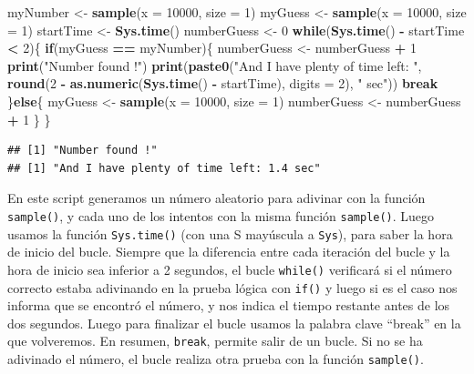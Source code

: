 \documentclass[
]{book}
\newenvironment{Shaded}{\begin{snugshade}}{\end{snugshade}}
\newcommand{\ControlFlowTok}[1]{\textcolor[rgb]{0.13,0.29,0.53}{\textbf{#1}}}
\newcommand{\DataTypeTok}[1]{\textcolor[rgb]{0.13,0.29,0.53}{#1}}
\newcommand{\DecValTok}[1]{\textcolor[rgb]{0.00,0.00,0.81}{#1}}
\newcommand{\KeywordTok}[1]{\textcolor[rgb]{0.13,0.29,0.53}{\textbf{#1}}}
\newcommand{\NormalTok}[1]{#1}
\newcommand{\OperatorTok}[1]{\textcolor[rgb]{0.81,0.36,0.00}{\textbf{#1}}}
\newcommand{\StringTok}[1]{\textcolor[rgb]{0.31,0.60,0.02}{#1}}
\begin{document}
\begin{Shaded}
\begin{Highlighting}[]
\NormalTok{myNumber <-}\StringTok{ }\KeywordTok{sample}\NormalTok{(}\DataTypeTok{x =} \DecValTok{10000}\NormalTok{, }\DataTypeTok{size =} \DecValTok{1}\NormalTok{)}
\NormalTok{myGuess <-}\StringTok{ }\KeywordTok{sample}\NormalTok{(}\DataTypeTok{x =} \DecValTok{10000}\NormalTok{, }\DataTypeTok{size =} \DecValTok{1}\NormalTok{)}
\NormalTok{startTime <-}\StringTok{ }\KeywordTok{Sys.time}\NormalTok{()}
\NormalTok{numberGuess <-}\StringTok{ }\DecValTok{0}
\ControlFlowTok{while}\NormalTok{(}\KeywordTok{Sys.time}\NormalTok{() }\OperatorTok{-}\StringTok{ }\NormalTok{startTime }\OperatorTok{<}\StringTok{ }\DecValTok{2}\NormalTok{)\{}
  \ControlFlowTok{if}\NormalTok{(myGuess }\OperatorTok{==}\StringTok{ }\NormalTok{myNumber)\{}
\NormalTok{    numberGuess <-}\StringTok{ }\NormalTok{numberGuess }\OperatorTok{+}\StringTok{ }\DecValTok{1}
    \KeywordTok{print}\NormalTok{(}\StringTok{"Number found !"}\NormalTok{)}
    \KeywordTok{print}\NormalTok{(}\KeywordTok{paste0}\NormalTok{(}\StringTok{"And I have plenty of time left: "}\NormalTok{, }
      \KeywordTok{round}\NormalTok{(}\DecValTok{2} \OperatorTok{-}\StringTok{ }\KeywordTok{as.numeric}\NormalTok{(}\KeywordTok{Sys.time}\NormalTok{() }\OperatorTok{-}\StringTok{ }\NormalTok{startTime), }\DataTypeTok{digits =} \DecValTok{2}\NormalTok{), }
      \StringTok{" sec"}\NormalTok{))}
    \ControlFlowTok{break}
\NormalTok{  \}}\ControlFlowTok{else}\NormalTok{\{}
\NormalTok{    myGuess <-}\StringTok{ }\KeywordTok{sample}\NormalTok{(}\DataTypeTok{x =} \DecValTok{10000}\NormalTok{, }\DataTypeTok{size =} \DecValTok{1}\NormalTok{)}
\NormalTok{    numberGuess <-}\StringTok{ }\NormalTok{numberGuess }\OperatorTok{+}\StringTok{ }\DecValTok{1}
\NormalTok{  \}}
\NormalTok{\}}
\end{Highlighting}
\end{Shaded}

\begin{verbatim}
## [1] "Number found !"
## [1] "And I have plenty of time left: 1.4 sec"
\end{verbatim}

En este script generamos un número aleatorio para adivinar con la función \texttt{sample()}, y cada uno de los intentos con la misma función \texttt{sample()}. Luego usamos la función \texttt{Sys.time()} (con una S mayúscula a \texttt{Sys}), para saber la hora de inicio del bucle. Siempre que la diferencia entre cada iteración del bucle y la hora de inicio sea inferior a 2 segundos, el bucle \texttt{while()} verificará si el número correcto estaba adivinando en la prueba lógica con \texttt{if()} y luego si es el caso nos informa que se encontró el número, y nos indica el tiempo restante antes de los dos segundos. Luego para finalizar el bucle usamos la palabra clave ``break'' en la que volveremos. En resumen, \texttt{break}, permite salir de un bucle. Si no se ha adivinado el número, el bucle realiza otra prueba con la función \texttt{sample()}.
\end{document}
